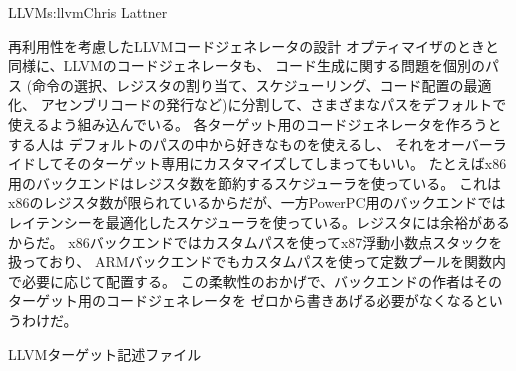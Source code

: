 \begin{aosachapter}{LLVM}{s:llvm}{Chris Lattner}
\begin{aosasect1}{再利用性を考慮したLLVMコードジェネレータの設計}
オプティマイザのときと同様に、LLVMのコードジェネレータも、
コード生成に関する問題を個別のパス
(命令の選択、レジスタの割り当て、スケジューリング、コード配置の最適化、
アセンブリコードの発行など)に分割して、さまざまなパスをデフォルトで使えるよう組み込んでいる。
各ターゲット用のコードジェネレータを作ろうとする人は
デフォルトのパスの中から好きなものを使えるし、
それをオーバーライドしてそのターゲット専用にカスタマイズしてしまってもいい。
たとえばx86用のバックエンドはレジスタ数を節約するスケジューラを使っている。
これはx86のレジスタ数が限られているからだが、一方PowerPC用のバックエンドでは
レイテンシーを最適化したスケジューラを使っている。レジスタには余裕があるからだ。
x86バックエンドではカスタムパスを使ってx87浮動小数点スタックを扱っており、
ARMバックエンドでもカスタムパスを使って定数プールを関数内で必要に応じて配置する。
この柔軟性のおかげで、バックエンドの作者はそのターゲット用のコードジェネレータを
ゼロから書きあげる必要がなくなるというわけだ。

\begin{aosasect2}{LLVMターゲット記述ファイル}


\end{aosasect2}
\end{aosasect1}
\end{aosachapter}
